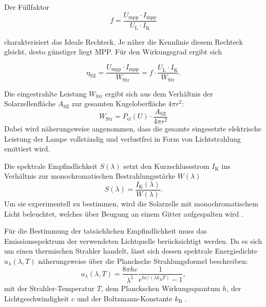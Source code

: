 \documentclass[11pt,a4paper]{article}
\numberwithin{equation}{section}
\begin{document}
Der F\"ullfaktor 
\begin{equation}
\textit{f} = \frac{U_{\text{mpp}} \cdot I_{\text{mpp}}}{U_{\text{L}} \cdot I_{\text{K}}}
\label{eq:ff}
\end{equation}

\noindent charakterisiert das Ideale Rechteck. Je n\"aher die Kennlinie diesem Rechteck gleicht, desto g\"unstiger liegt MPP. F\"ur den Wirkungsgrad ergibt sich 

\begin{equation}
\eta_\text{SZ} = \frac{U_\text{mpp} \cdot I_\text{mpp}}{W_\text{Str}} = \textit{f} \cdot \frac{U_\text{L} \cdot I_\text{K}}{W_\text{Str}}.
\label{eq:wkSZ}
\end{equation}

\noindent Die eingestrahlte Leistung $W_\text{Str}$ ergibt sich aus dem Verh\"altnis der Solarzellenfl\"ache $A_\text{SZ}$ zur gesamten Kugeloberfl\"ache $4 \pi r^2$:
\begin{equation}
W_\text{Str} = P_\text{el}(U) \cdot \frac{A_\text{SZ}}{4 \pi r^2}
\label{eq:wstr_berechnung}
\end{equation}
\noindent Dabei wird n\"aherungsweise angenommen, dass die gesamte eingesetzte elektrische Leistung der Lampe vollst\"andig und verlustfrei in Form von Lichtstrahlung emittiert wird.

\noindent Die spektrale Empfindlichkeit $S(\lambda)$ setzt den Kurzschlussstrom $I_{\text{K}}$ ins Verh\"altnis zur monochromatischen Bestrahlungsst\"arke $W(\lambda)$ 
\begin{equation}
S(\lambda) = \frac{I_{\text{K}}(\lambda)}{W(\lambda)}.
\label{eq:spek}
\end{equation}
\noindent Um sie experimentell zu bestimmen, wird die Solarzelle mit monochromatischem Licht beleuchtet, welches \"uber Beugung an einem Gitter aufgespalten wird \cite{demtroeder2017}. 

\noindent F\"ur die Bestimmung der tats\"achlichen Empfindlichkeit muss das Emissionsspektrum der verwendeten Lichtquelle ber\"ucksichtigt werden. Da es sich um einen thermischen Strahler handelt, l\"asst sich dessen spektrale Energiedichte $u_\lambda(\lambda,T)$ n\"aherungsweise \"uber die Plancksche Strahlungsformel beschreiben:
\begin{equation}
u_\lambda(\lambda,T) = \frac{8\pi h c}{\lambda^5}\frac{1}{e^{hc/(\lambda k_B T)}-1} \label{eq:planck},
\end{equation}
\noindent mit der Strahler-Temperatur $T$, dem Planckschen Wirkungsquantum $h$, der Lichtgeschwindigkeit $c$ und der Boltzmann-Konstante $k_\text{B}$ \cite{demtroeder2017}. 
\end{document}
